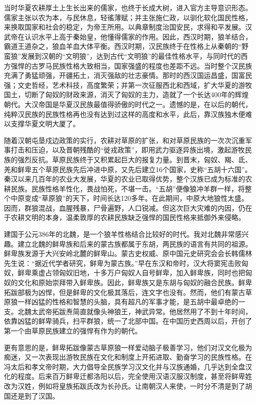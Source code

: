 \par 当时华夏农耕厚土上生长出来的儒家，也终于长成大树，进入官方主导意识形态。儒家主张以农为本，与民休息，轻徭薄赋；并主张施仁政，以驯化软化国民性格，来换取国家和社会的稳定，为帝王所用。以典章制度治国安民，求得和平发展。汉武帝在认识水平上高于秦始皇，他懂得儒家的作用。因此，西汉时期，狼羊结合，霸道王道杂之，狼血羊血大体平衡。西汉时期，汉民族终于在性格上从秦朝的“野蛮狼”发展到汉朝的“文明狼”，达到古代“文明狼”的最佳性格水平，与同时代的西方强悍的古罗马民族性格大致相当，国家强盛的程度也差距不远。当时整个汉民族充满了勇猛顽强，开疆拓土，消灭强敌的壮志豪情。那时的西汉国运昌盛，国富民强；文史哲经，艺术科技，高度繁荣；并第一次征服西北和西域，扩大华夏的游牧国土，切断了匈奴的财政来源，消灭了匈奴的主力，造就了一个长达400年的辉煌朝代。大汉帝国是华夏汉民族最值得骄傲的时代之一。遗憾的是，在以后的朝代，纯粹汉民族的民族性格再也没有达到过这样的高度和水平，此后，靠汉族独木便难以支撑华夏文明大厦了。
\par 随着汉朝屯垦戍边政策的实行，农耕对草原的扩张，和对草原民族的一次次沉重军事打击和压迫，以及晋朝残酷的“徙戎政策”，即用武力驱逐异族出境，激起游牧民族的强烈反抗。草原民族终于又积累起巨大的报复力量。到晋末，匈奴、羯、氐、羌和鲜卑五个草原民族先后冲进中原，又先后建立16个国家，史称“五胡十六国”。秦汉以来几百年的农业大发展，华夏的农业已取得优势，整个汉族已成为标准的农耕民族。民族性格羊性化，畏战怕死，不堪一击。“五胡”便像狼冲羊群一样，将整个中原变成“草原狼”的天下，时间长达120多年。在此期间，中原大地狼性太盛。因而，群狼混战，血腥残暴，尸骨遍野，人口锐减。但这次巨大灾难的内因，仍在于农耕文明的本身，温柔敦厚的农耕民族缺乏强悍的国民性格来抵御外来侵略。
\par 
\par 建国于公元386年的北魏，是一个狼羊性格结合比较好的时代。我对北魏非常感兴趣。建立北魏的鲜卑族和后来的蒙古族都属于东胡，两民族的语言有共同的祖源。鲜卑族发源于大兴安岭北麓的鲜卑山。蒙古史权威、原中国元史研究会会长韩儒林先生说：“据近代学者研究，鲜卑为蒙古族。”早在东汉和帝时，汉大将窦宪击败匈奴，鲜卑乘虚占领匈奴旧地，十多万户匈奴人自号鲜卑，加入鲜卑族，同时也把匈奴的文化和原始崇拜带入鲜卑族。因此，鲜卑族又是东胡与匈奴的融合民族。鲜卑拓跋部极为凶悍，但是鲜卑的文化极其落后，连文字也没有。然而，他们有蒙古草原狼一样凶猛的性格和智慧的头脑，具有超凡的军事才能，是五胡中最卓绝的一支。北魏太武帝拓跋焘简直就像头神狼王，神武异常。他居然用了不到十年时间，依靠凶猛的鲜卑骑兵，扫平群狼，统一了北部中国。在中国历史西周以后，开创了第一个由草原民族建立的强悍有作为的朝代。
\par 更有意思的是，鲜卑拓跋像蒙古草原狼一样爱动脑子极善学习，他们对汉文化极为痴迷，又一次表现出游牧民族在文化和制度上开拓进取、勤奋学习的民族性格。在冯太后和孝文帝时期，大力倡导全民族学习汉文化并与汉族通婚，几乎达到全盘汉化的程度。后来百万鲜卑迁都洛阳以后，完全使用汉语汉服汉制度，甚至将鲜卑姓改为汉姓，例如将皇族拓跋氏改为长孙氏。让南朝汉人来使，一时分不清是到了胡国还是到了汉国。
